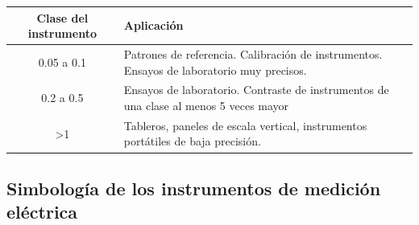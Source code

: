 \begin{tabular}{|c|p{7cm}|}
\hline 
Clase del instrumento & Aplicación \\ 
\hline 
0.05 a 0.1 & Patrones de referencia. Calibración de instrumentos. Ensayos de laboratorio muy precisos. \\ 
\hline 
0.2 a 0.5 & Ensayos de laboratorio. Contraste de instrumentos de una clase al menos 5 veces mayor \\ 
\hline 
>1 & Tableros, paneles de escala vertical, instrumentos portátiles de baja precisión. \\ 
\hline 
\end{tabular} 

\subsection{Simbología de los instrumentos de medición eléctrica}

